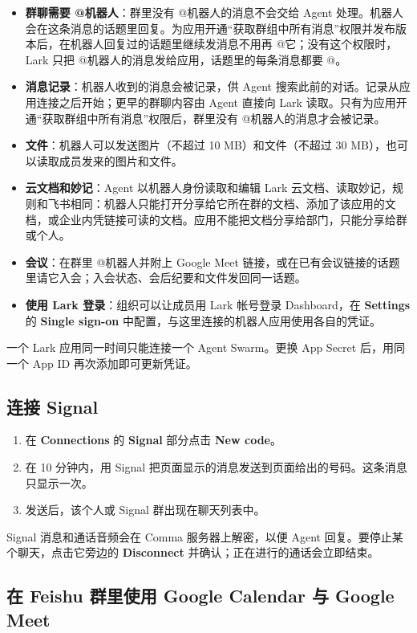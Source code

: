 \documentclass[UTF8,a4paper,11pt]{ctexart}
\begin{document}
\begin{itemize}
  \item \textbf{群聊需要 @机器人}：群里没有 @机器人的消息不会交给 Agent 处理。机器人会在这条消息的话题里回复。为应用开通“获取群组中所有消息”权限并发布版本后，在机器人回复过的话题里继续发消息不用再 @它；没有这个权限时，Lark 只把 @机器人的消息发给应用，话题里的每条消息都要 @。
  \item \textbf{消息记录}：机器人收到的消息会被记录，供 Agent 搜索此前的对话。记录从应用连接之后开始；更早的群聊内容由 Agent 直接向 Lark 读取。只有为应用开通“获取群组中所有消息”权限后，群里没有 @机器人的消息才会被记录。
  \item \textbf{文件}：机器人可以发送图片（不超过 10 MB）和文件（不超过 30 MB），也可以读取成员发来的图片和文件。
  \item \textbf{云文档和妙记}：Agent 以机器人身份读取和编辑 Lark 云文档、读取妙记，规则和飞书相同：机器人只能打开分享给它所在群的文档、添加了该应用的文档，或企业内凭链接可读的文档。应用不能把文档分享给部门，只能分享给群或个人。
  \item \textbf{会议}：在群里 @机器人并附上 Google Meet 链接，或在已有会议链接的话题里请它入会；入会状态、会后纪要和文件发回同一话题。
  \item \textbf{使用 Lark 登录}：组织可以让成员用 Lark 帐号登录 Dashboard，在 \textbf{Settings} 的 \textbf{Single sign-on} 中配置，与这里连接的机器人应用使用各自的凭证。
\end{itemize}

一个 Lark 应用同一时间只能连接一个 Agent Swarm。更换 App Secret 后，用同一个 App ID 再次添加即可更新凭证。

\subsection{连接 Signal}

\begin{enumerate}
  \item 在 \textbf{Connections} 的 \textbf{Signal} 部分点击 \textbf{New code}。
  \item 在 10 分钟内，用 Signal 把页面显示的消息发送到页面给出的号码。这条消息只显示一次。
  \item 发送后，该个人或 Signal 群出现在聊天列表中。
\end{enumerate}

Signal 消息和通话音频会在 Comma 服务器上解密，以便 Agent 回复。要停止某个聊天，点击它旁边的 \textbf{Disconnect} 并确认；正在进行的通话会立即结束。

\subsection{在 Feishu 群里使用 Google Calendar 与 Google Meet}
\end{document}
